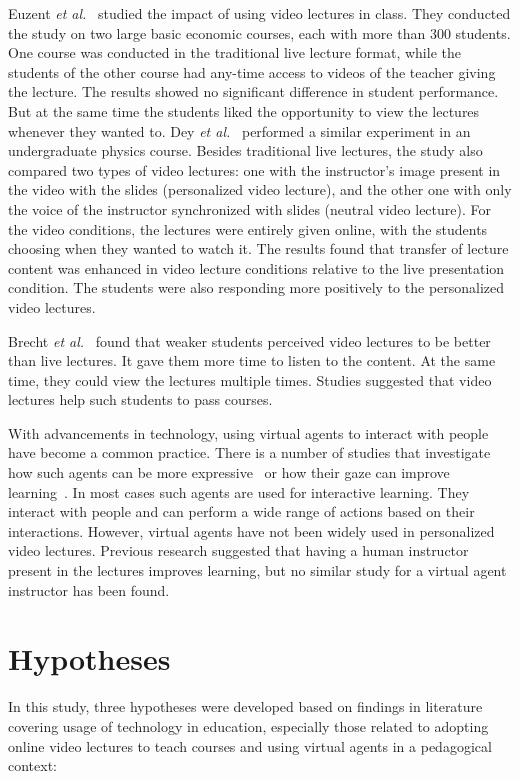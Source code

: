 \documentclass{sigchi}
\begin{document}
Euzent \textit{et al.}~\cite{euzent2011assessing} studied the impact of using video lectures in class. They conducted the study on two large basic economic courses, each with more than 300 students. One course was conducted in the traditional live lecture format, while the students of the other course had any-time access to videos of the teacher giving the lecture. The results showed no significant difference in student performance. But at the same time the students liked the opportunity to view the lectures whenever they wanted to. Dey \textit{et al.}~\cite{dey2009bringing} performed a similar experiment in an undergraduate physics course. Besides traditional live lectures, the study also compared two types of video lectures: one with the instructor's image present in the video with the slides (personalized video lecture), and the other one with only the voice of the instructor synchronized with slides (neutral video lecture). For the video conditions, the lectures were entirely given online, with the students choosing when they wanted to watch it. The results found that transfer of lecture content was enhanced in video lecture conditions relative to the live presentation condition. The students were also responding more positively to the personalized video lectures. 

Brecht \textit{et al.}~\cite{brecht2008enabling} found that weaker students perceived video lectures to be better than live lectures. It gave them more time to listen to the content. At the same time, they could view the lectures multiple times. Studies suggested that video lectures help such students to pass courses.

With advancements in technology, using virtual agents to interact with people have become a common practice. There is a number of studies that investigate how such agents can be more expressive~\cite{pelachaud2009modelling} or how their gaze can improve learning~\cite{andrist2012designing}. In most cases such agents are used for interactive learning. They interact with people and can perform a wide range of actions based on their interactions. However, virtual agents have not been widely used in personalized video lectures. Previous research suggested that having a human instructor present in the lectures improves learning, but no similar study for a virtual agent instructor has been found.


\section{Hypotheses}
In this study, three hypotheses were developed based on findings in literature covering usage of technology in education, especially those related to adopting online video lectures to teach courses and using virtual agents in a pedagogical context:
\end{document}

